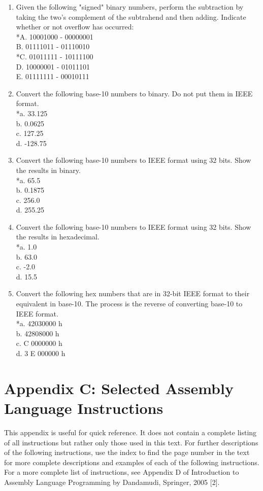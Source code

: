 \documentclass[10pt]{article}
\begin{document}
\begin{enumerate}
E. $01111111+00000001$
  \item Given the following "signed" binary numbers, perform the subtraction by taking the two's complement of the subtrahend and then adding. Indicate whether or not overflow has occurred:\\
*A. 10001000 - 00000001\\
B. 01111011 - 01110010\\
*C. 01011111 - 10111100\\
D. 10000001 - 01011101\\
E. 01111111 - 00010111
  \item Convert the following base-10 numbers to binary. Do not put them in IEEE format.\\
*a. 33.125\\
b. 0.0625\\
c. 127.25\\
d. -128.75
  \item Convert the following base-10 numbers to IEEE format using 32 bits. Show the results in binary.\\
*a. 65.5\\
b. 0.1875\\
c. 256.0\\
d. 255.25
  \item Convert the following base-10 numbers to IEEE format using 32 bits. Show the results in hexadecimal.\\
*a. 1.0\\
b. 63.0\\
c. -2.0\\
d. 15.5
  \item Convert the following hex numbers that are in 32-bit IEEE format to their equivalent in base-10. The process is the reverse of converting base-10 to IEEE format.\\
*a. 42030000 h\\
b. 42808000 h\\
c. C 0000000 h\\
d. 3 E 000000 h
\end{enumerate}

\section*{Appendix C: Selected Assembly Language Instructions}
This appendix is useful for quick reference. It does not contain a complete listing of all instructions but rather only those used in this text. For further descriptions of the following instructions, use the index to find the page number in the text for more complete descriptions and examples of each of the following instructions. For a more complete list of instructions, see Appendix D of Introduction to Assembly Language Programming by Dandamudi, Springer, 2005 [2].
\end{document}
